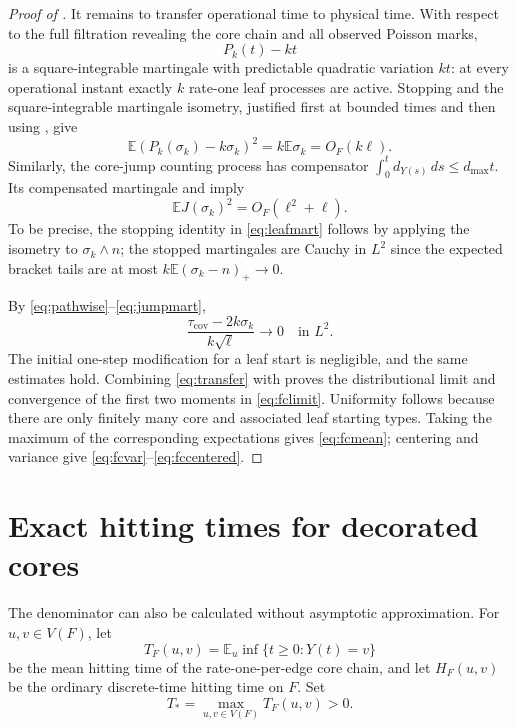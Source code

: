 \documentclass[11pt]{amsart}
\theoremstyle{remark}
\numberwithin{equation}{section}
\newcommand{\E}{\mathbb{E}}
\newcommand{\taucov}{\tau_{\mathrm{cov}}}
\begin{document}
\begin{proof}[Proof of ]
It remains to transfer operational time to physical time. With respect to the full filtration revealing the core chain and all observed Poisson marks,
\[
P_k(t)-kt
\]
is a square-integrable martingale with predictable quadratic variation $kt$: at every operational instant exactly $k$ rate-one leaf processes are active. Stopping and the square-integrable martingale isometry, justified first at bounded times and then using , give
\begin{equation}\label{eq:leafmart}
\E(P_k(\sigma_k)-k\sigma_k)^2=k\E\sigma_k=O_F(k\ell).
\end{equation}
Similarly, the core-jump counting process has compensator $\int_0^td_{Y(s)}\,ds\le d_{\max}t$. Its compensated martingale and  imply
\begin{equation}\label{eq:jumpmart}
\E J(\sigma_k)^2=O_F(\ell^2+\ell).
\end{equation}
To be precise, the stopping identity in \eqref{eq:leafmart} follows by applying the isometry to $\sigma_k\wedge n$; the stopped martingales are Cauchy in $L^2$ since the expected bracket tails are at most $k\E(\sigma_k-n)_+\to 0$.

By \eqref{eq:pathwise}--\eqref{eq:jumpmart},
\begin{equation}\label{eq:transfer}
\frac{\taucov-2k\sigma_k}{k\sqrt\ell}\longrightarrow 0\quad\text{in }L^2.
\end{equation}
The initial one-step modification for a leaf start is negligible, and the same estimates hold. Combining \eqref{eq:transfer} with  proves the distributional limit and convergence of the first two moments in \eqref{eq:fclimit}. Uniformity follows because there are only finitely many core and associated leaf starting types. Taking the maximum of the corresponding expectations gives \eqref{eq:fcmean}; centering and variance give \eqref{eq:fcvar}--\eqref{eq:fccentered}.
\end{proof}

\section{Exact hitting times for decorated cores}\label{sec:decorated}

The denominator can also be calculated without asymptotic approximation. For $u,v\in V(F)$, let
\[
T_F(u,v)=\E_u\inf\{t\ge 0:Y(t)=v\}
\]
be the mean hitting time of the rate-one-per-edge core chain, and let $H_F(u,v)$ be the ordinary discrete-time hitting time on $F$. Set
\[
T_*=\max_{u,v\in V(F)}T_F(u,v)>0.
\]
\end{document}
